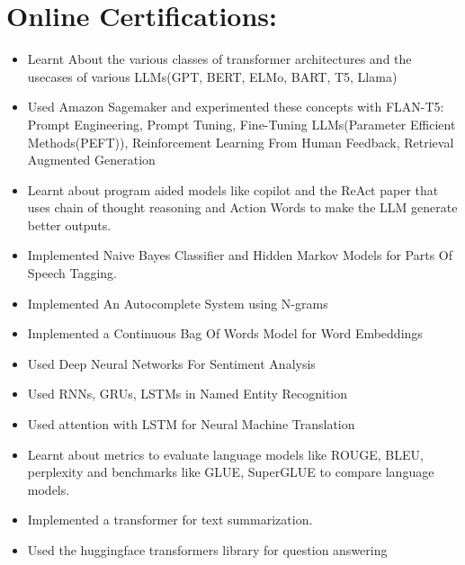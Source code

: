 \documentclass[11pt,a4paper,sans]{moderncv}
\begin{document}
\section{Online Certifications:}
 \vspace{5pt}
\begin{itemize}
  \item Learnt About the various classes of transformer architectures and the usecases of various LLMs(GPT, BERT, ELMo, BART, T5, Llama)
\item Used Amazon Sagemaker and experimented these concepts with FLAN-T5: Prompt Engineering, Prompt Tuning, Fine-Tuning LLMs(Parameter Efficient Methods(PEFT)), Reinforcement Learning From Human Feedback, Retrieval Augmented Generation
\item Learnt about program aided models like copilot and the ReAct paper that uses chain of thought reasoning and Action Words to make the LLM generate better outputs.
\end{itemize}\vspace{5pt}
 \vspace{5pt}
\begin{itemize}
  \item Implemented Naive Bayes Classifier and Hidden Markov Models for Parts Of Speech Tagging.
  \item Implemented An Autocomplete System using N-grams
  \item Implemented a Continuous Bag Of Words Model for Word Embeddings
  \item Used Deep Neural Networks For Sentiment Analysis
  \item Used RNNs, GRUs, LSTMs in Named Entity Recognition
  \item Used attention with LSTM for Neural Machine Translation
  \item Learnt about metrics to evaluate language models like ROUGE, BLEU, perplexity and benchmarks like GLUE, SuperGLUE to compare language models.
  \item Implemented a transformer for text summarization.
  \item Used the huggingface transformers library for question answering
\end{itemize}\vspace{5pt}
\end{document}
